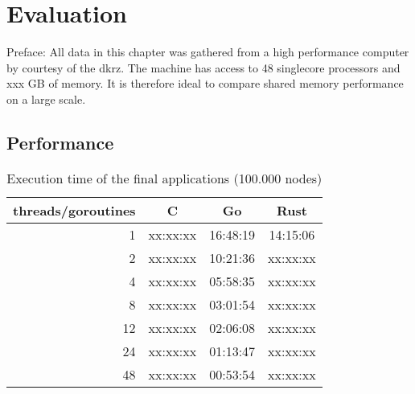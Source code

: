 \chapter{Evaluation}
\label{ch:Evaluation}


Preface: All data in this chapter was gathered from a high performance computer by courtesy of the \gls{dkrz}. The machine has access to 48 singlecore processors and xxx GB of memory. It is therefore ideal to compare shared memory performance on a large scale.

\section{Performance}
\label{sec:Evaluaton::Performance}

\begin{table}[htb]
    \centering
    \begin{tabular}{rccc}
        \toprule
            threads/goroutines
            & C
            & Go
            & Rust \\
        \midrule

            1
            & xx:xx:xx
            & 16:48:19
            & 14:15:06 \\

            2
            & xx:xx:xx
            & 10:21:36
            & xx:xx:xx \\

            4
            & xx:xx:xx
            & 05:58:35
            & xx:xx:xx \\

            8
            & xx:xx:xx
            & 03:01:54
            & xx:xx:xx \\

            12
            & xx:xx:xx
            & 02:06:08
            & xx:xx:xx \\

            24
            & xx:xx:xx
            & 01:13:47
            & xx:xx:xx \\

            48
            & xx:xx:xx
            & 00:53:54
            & xx:xx:xx \\

        \bottomrule
    \end{tabular}
    \caption{Execution time of the final applications (100.000 nodes)}
    \label{tb:final_execution_time}
\end{table}

